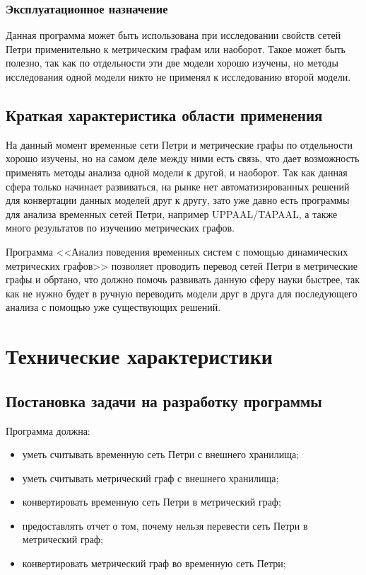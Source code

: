 \documentclass{../TechDoc}
\begin{document}
	\subsubsection{Эксплуатационное назначение}
	Данная программа может быть использована при исследовании свойств сетей Петри применительно к метрическим графам или наоборот. Такое может быть полезно, так как по отдельности эти две модели хорошо изучены, но методы исследования одной модели никто не применял к исследованию второй модели.
	
	\subsection{Краткая характеристика области применения}
	На данный момент временные сети Петри и метрические графы по отдельности хорошо изучены, но на самом деле между ними есть связь\cite{CorMgTapn}, что дает возможность применять методы анализа одной модели к другой, и наоборот. Так как данная сфера только начинает развиваться, на рынке нет автоматизированных решений для конвертации данных моделей друг к другу, зато уже давно есть программы для анализа временных сетей Петри, например UPPAAL\cite{uppaal}/TAPAAL\cite{tapaal},
	а также много результатов по изучению метрических графов. 
	
	
	Программа <<Анализ поведения временных систем с помощью динамических метрических графов>> позволяет проводить перевод сетей Петри в метрические графы и обртано, что должно помочь развивать данную сферу науки быстрее, так как не нужно будет в ручную переводить модели друг в друга для последующего анализа с помощью уже существующих решений.
	
	\section{Технические характеристики}
	\subsection{Постановка задачи на разработку программы}
	Программа должна:
	\begin{itemize}
		\item уметь считывать временную сеть Петри с внешнего хранилища;
		\item уметь считывать метрический граф с внешнего хранилища;
		\item конвертировать временную сеть Петри в метрический граф;
		\item предоставлять отчет о том, почему нельзя перевести сеть Петри в метрический граф;
		\item конвертировать метрический граф во временную сеть Петри;
	\end{itemize}
	
\end{document}
